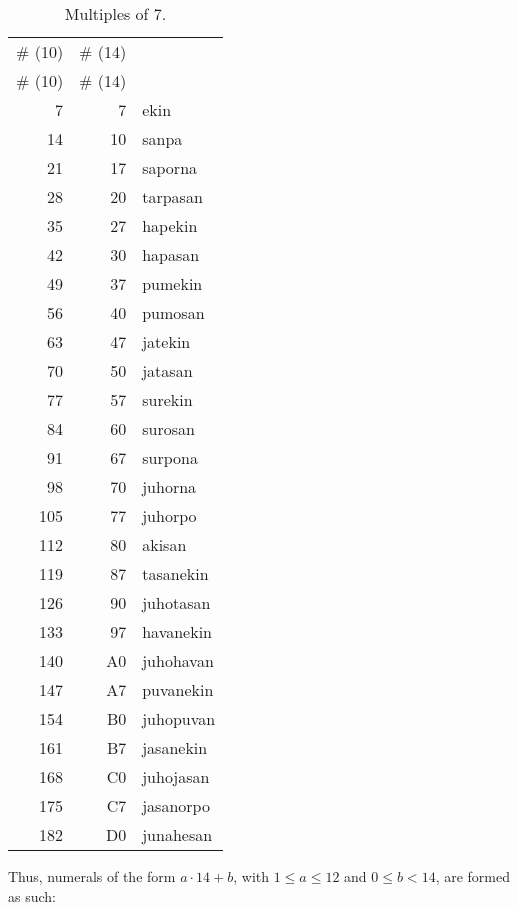 \documentclass{book}
\begin{document}
\begin{longtabu}[c]{|r|r|X|}
    \caption{Multiples of 7.}
    \centering
    
    \\ \hline
    \# (10) & \# (14) & \\
    \hline
    \endfirsthead
    
    \hline
    \# (10) & \# (14) & \\
    \hline
    \endhead
    
    \hline
    \endfoot
    
    \hline
    \endlastfoot
    
    7 & 7 & ekin \\
    14 & 10 & sanpa \\
    21 & 17 & saporna \\
    28 & 20 & tarpasan \\
    35 & 27 & hapekin \\
    42 & 30 & hapasan \\
    49 & 37 & pumekin \\
    56 & 40 & pumosan \\
    63 & 47 & jatekin \\
    70 & 50 & jatasan \\
    77 & 57 & surekin \\
    84 & 60 & surosan \\
    91 & 67 & surpona \\
    98 & 70 & juhorna \\
    105 & 77 & juhorpo \\
    112 & 80 & akisan \\
    119 & 87 & tasanekin \\
    126 & 90 & juhotasan \\
    133 & 97 & havanekin \\
    140 & A0 & juhohavan \\
    147 & A7 & puvanekin \\
    154 & B0 & juhopuvan \\
    161 & B7 & jasanekin \\
    168 & C0 & juhojasan \\
    175 & C7 & jasanorpo \\
    182 & D0 & junahesan \\
\end{longtabu}

Thus, numerals of the form $a \cdot 14 + b$, with $1 \le a \le 12$ and $0 \le b < 14$, are formed as such:
\end{document}
